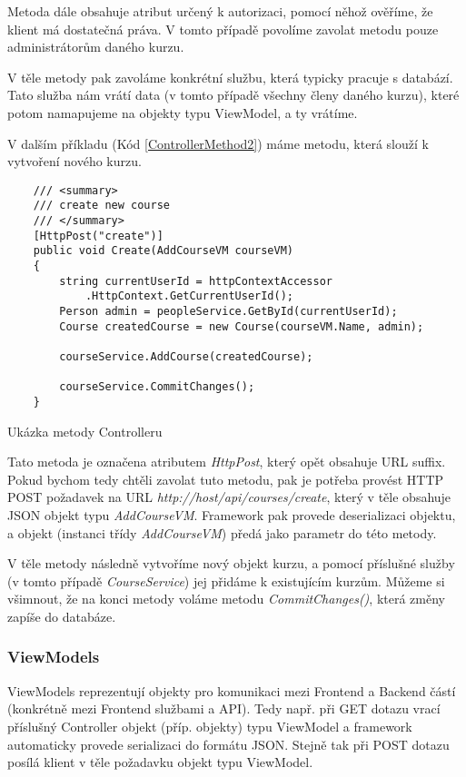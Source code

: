 Metoda dále obsahuje atribut určený k autorizaci, pomocí něhož ověříme, že klient má dostatečná práva. V tomto případě povolíme zavolat metodu pouze administrátorům daného kurzu.

V těle metody pak zavoláme konkrétní službu, která typicky pracuje s databází. Tato služba nám vrátí data (v tomto případě všechny členy daného kurzu), které potom namapujeme na objekty typu ViewModel, a ty vrátíme.

\vspace{\baselineskip}

V dalším příkladu (Kód \ref{ControllerMethod2}) máme metodu, která slouží k vytvoření nového kurzu.

\begin{program}
	\begin{lstlisting}
	/// <summary>
	/// create new course
	/// </summary>
	[HttpPost("create")]
	public void Create(AddCourseVM courseVM)
	{
		string currentUserId = httpContextAccessor
			.HttpContext.GetCurrentUserId();
		Person admin = peopleService.GetById(currentUserId);
		Course createdCourse = new Course(courseVM.Name, admin);
		
		courseService.AddCourse(createdCourse);
		
		courseService.CommitChanges();
	}
	\end{lstlisting}
	\caption{Ukázka metody Controlleru}
	\label{ControllerMethod2}
\end{program}

Tato metoda je označena atributem \textit{HttpPost}, který opět obsahuje URL suffix. Pokud bychom tedy chtěli zavolat tuto metodu, pak je potřeba provést HTTP POST požadavek na URL
\newline
\textit{http://host/api/courses/create}, který v těle obsahuje JSON objekt typu \textit{AddCourseVM}. Framework pak provede deserializaci objektu, a objekt (instanci třídy \textit{AddCourseVM}) předá jako parametr do této metody.

V těle metody následně vytvoříme nový objekt kurzu, a pomocí příslušné služby (v tomto případě \textit{CourseService}) jej přidáme k existujícím kurzům. Můžeme si všimnout, že na konci metody voláme metodu \textit{CommitChanges()}, která změny zapíše do databáze.

\subsubsection*{ViewModels}
\label{serverVM}

ViewModels reprezentují objekty pro komunikaci mezi Frontend a Backend částí (konkrétně mezi Frontend službami a API). Tedy např. při GET dotazu vrací příslušný Controller objekt (příp. objekty) typu ViewModel a framework automaticky provede serializaci do formátu JSON. Stejně tak při POST dotazu posílá klient v těle požadavku objekt typu ViewModel.

